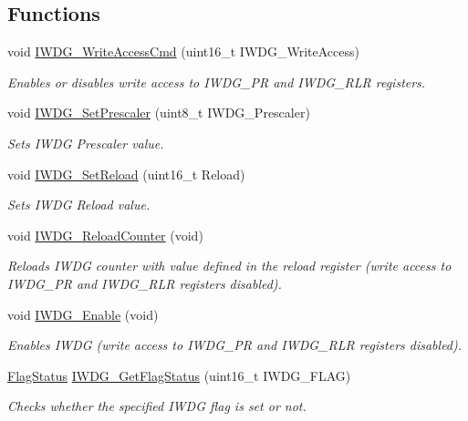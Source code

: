 \subsection*{Functions}
\begin{DoxyCompactItemize}
\item 
void \hyperlink{group___i_w_d_g___private___functions_gae466681e5bdc11b353c508b89d75ca05}{I\+W\+D\+G\+\_\+\+Write\+Access\+Cmd} (uint16\+\_\+t I\+W\+D\+G\+\_\+\+Write\+Access)
\begin{DoxyCompactList}\small\item\em Enables or disables write access to I\+W\+D\+G\+\_\+\+PR and I\+W\+D\+G\+\_\+\+R\+LR registers. \end{DoxyCompactList}\item 
void \hyperlink{group___i_w_d_g___private___functions_ga4fa7f1cd690533a35ad9e4729c0450a3}{I\+W\+D\+G\+\_\+\+Set\+Prescaler} (uint8\+\_\+t I\+W\+D\+G\+\_\+\+Prescaler)
\begin{DoxyCompactList}\small\item\em Sets I\+W\+DG Prescaler value. \end{DoxyCompactList}\item 
void \hyperlink{group___i_w_d_g___private___functions_gae2a14752a0431f23cb80cebf202ac365}{I\+W\+D\+G\+\_\+\+Set\+Reload} (uint16\+\_\+t Reload)
\begin{DoxyCompactList}\small\item\em Sets I\+W\+DG Reload value. \end{DoxyCompactList}\item 
void \hyperlink{group___i_w_d_g___private___functions_ga7147ebabdc3fef97f532b171a4e70d49}{I\+W\+D\+G\+\_\+\+Reload\+Counter} (void)
\begin{DoxyCompactList}\small\item\em Reloads I\+W\+DG counter with value defined in the reload register (write access to I\+W\+D\+G\+\_\+\+PR and I\+W\+D\+G\+\_\+\+R\+LR registers disabled). \end{DoxyCompactList}\item 
void \hyperlink{group___i_w_d_g___private___functions_ga479b2921c86f8c67b819f5c4bea6bdb6}{I\+W\+D\+G\+\_\+\+Enable} (void)
\begin{DoxyCompactList}\small\item\em Enables I\+W\+DG (write access to I\+W\+D\+G\+\_\+\+PR and I\+W\+D\+G\+\_\+\+R\+LR registers disabled). \end{DoxyCompactList}\item 
\hyperlink{group___exported__types_ga89136caac2e14c55151f527ac02daaff}{Flag\+Status} \hyperlink{group___i_w_d_g___private___functions_ga37f050cfbedc0c15f9e0816c0b22011e}{I\+W\+D\+G\+\_\+\+Get\+Flag\+Status} (uint16\+\_\+t I\+W\+D\+G\+\_\+\+F\+L\+AG)
\begin{DoxyCompactList}\small\item\em Checks whether the specified I\+W\+DG flag is set or not. \end{DoxyCompactList}\end{DoxyCompactItemize}


